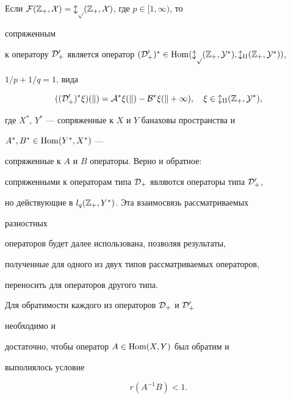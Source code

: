  


\begin{note} 


Если $\cal F(\Bbb Z_+,X)=l_p(\Bbb Z_+,X)$, где $p\in[1,\infty)$, то 


сопряженным 


к оператору $\cal D^0_+$ является оператор $(\cal 


D^0_+)^*\in\Hom(l_p(\Bbb Z_+,Y^*),l_q(\Bbb Z_+,Y^*))$, 


$1/p+1/q=1$, вида 


$$ 


((\cal D^0_+)^*\xi)(k)=A^*\xi(k)-B^*\xi(k+1),\quad 


\xi\in l_q(\Bbb Z_+,Y^*), 


$$ 


где $X^*$, $Y^*$ --- сопряженные к $X$ и $Y$ банаховы пространства и 


$A^*,B^*\in\operatorname{Hom}(Y^*,X^*)$ --- 


сопряженные к $A$ и $B$ операторы. Верно и обратное: 


сопряженными к операторам типа $\cal D_+$ являются операторы типа $\cal 


D^0_+$, 


но действующие в $l_q(\Bbb Z_+,Y^*)$. Эта взаимосвязь рассматриваемых 


разностных 


операторов будет далее использована, позволяя результаты, 


полученные для одного из двух типов рассматриваемых операторов,


переносить для операторов другого типа. 


\end{note} 


 


\begin{thm} 


Для обратимости каждого из операторов $\cal D_+$ и $\cal D^0_+$ 


необходимо и 


достаточно, чтобы оператор $A\in\operatorname{Hom}(X,Y)$ был обратим и 


выполнялось условие 


\begin{equation} 


r(A^{-1}B)<1. 


\end{equation} 


\end{thm} 


